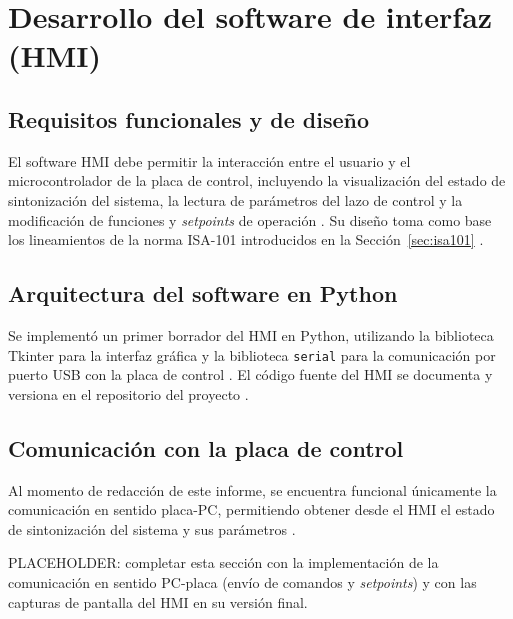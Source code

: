 \chapter{Desarrollo del software de interfaz (HMI)}
\label{cap:software_hmi}

\section{Requisitos funcionales y de dise\~no}
\label{sec:requisitos_hmi}

El software HMI debe permitir la interacci\'on entre el usuario y el
microcontrolador de la placa de control, incluyendo la visualizaci\'on
del estado de sintonizaci\'on del sistema, la lectura de par\'ametros
del lazo de control y la modificaci\'on de funciones y \emph{setpoints}
de operaci\'on \cite{sat2026}. Su dise\~no toma como base los
lineamientos de la norma ISA-101 introducidos en la
Secci\'on~\ref{sec:isa101} \cite{informeAbril2026}.

\section{Arquitectura del software en Python}
\label{sec:arquitectura_python}

Se implement\'o un primer borrador del HMI en Python, utilizando la
biblioteca Tkinter para la interfaz gr\'afica y la biblioteca
\texttt{serial} para la comunicaci\'on por puerto USB con la placa de
control \cite{informeAbril2026}. El c\'odigo fuente del HMI se
documenta y versiona en el repositorio del proyecto \cite{kicad_hsrl}.


\section{Comunicaci\'on con la placa de control}
\label{sec:comunicacion_placa}

Al momento de redacci\'on de este informe, se encuentra funcional
\'unicamente la comunicaci\'on en sentido placa-PC, permitiendo obtener
desde el HMI el estado de sintonizaci\'on del sistema y sus par\'ametros
\cite{informeAbril2026}.

PLACEHOLDER: completar esta secci\'on con la implementaci\'on de la
comunicaci\'on en sentido PC-placa (env\'io de comandos y
\emph{setpoints}) y con las capturas de pantalla del HMI en su versi\'on
final.
